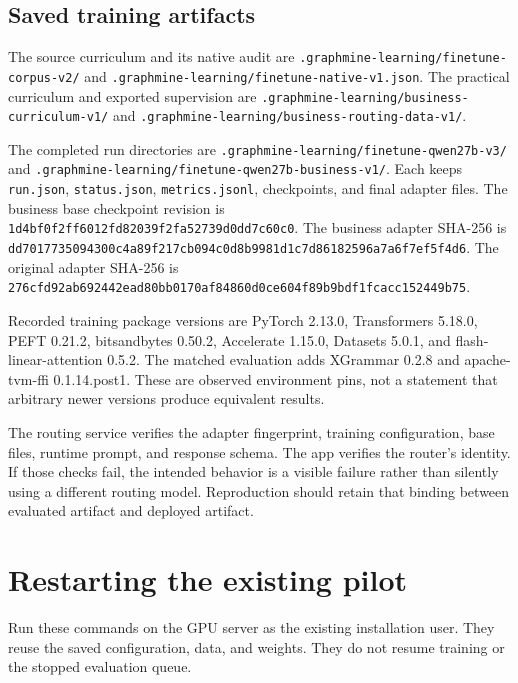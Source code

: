 \documentclass[11pt,a4paper]{article}
\newcommand{\pathref}[1]{\nolinkurl{#1}}
\begin{document}
\subsection{Saved training artifacts}

The source curriculum and its native audit are
\pathref{.graphmine-learning/finetune-corpus-v2/} and
\pathref{.graphmine-learning/finetune-native-v1.json}. The practical curriculum
and exported supervision are
\pathref{.graphmine-learning/business-curriculum-v1/} and
\pathref{.graphmine-learning/business-routing-data-v1/}.

The completed run directories are
\pathref{.graphmine-learning/finetune-qwen27b-v3/} and
\pathref{.graphmine-learning/finetune-qwen27b-business-v1/}.
Each keeps \pathref{run.json}, \pathref{status.json}, \pathref{metrics.jsonl},
checkpoints, and final adapter files. The business base checkpoint revision is
\pathref{1d4bf0f2ff6012fd82039f2fa52739d0dd7c60c0}.
The business adapter SHA-256 is
\pathref{dd7017735094300c4a89f217cb094c0d8b9981d1c7d86182596a7a6f7ef5f4d6}.
The original adapter SHA-256 is
\pathref{276cfd92ab692442ead80bb0170af84860d0ce604f89b9bdf1fcacc152449b75}.

Recorded training package versions are PyTorch 2.13.0, Transformers 5.18.0,
PEFT 0.21.2, bitsandbytes 0.50.2, Accelerate 1.15.0, Datasets 5.0.1, and
flash-linear-attention 0.5.2. The matched evaluation adds XGrammar 0.2.8 and
apache-tvm-ffi 0.1.14.post1. These are observed environment pins, not a statement
that arbitrary newer versions produce equivalent results.

The routing service verifies the adapter fingerprint, training configuration,
base files, runtime prompt, and response schema. The app verifies the router's
identity. If those checks fail, the intended behavior is a visible failure
rather than silently using a different routing model. Reproduction should retain
that binding between evaluated artifact and deployed artifact.

\section{Restarting the existing pilot}

Run these commands on the GPU server as the existing installation user.
They reuse the saved configuration, data, and weights. They do not resume
training or the stopped evaluation queue.
\end{document}
